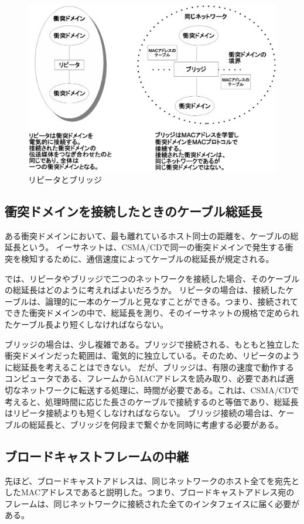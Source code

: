 \begin{figure}[htbp]
	\includegraphics[width=12cm,clip]{draw/repeaterbridge.eps}
	\caption{リピータとブリッジ}
	\label{fig:repeaterbridge}
\end{figure}

\subsection{衝突ドメインを接続したときのケーブル総延長}

ある衝突ドメインにおいて、最も離れているホスト同士の距離を、ケーブルの総延長という。
イーサネットは、CSMA/CDで同一の衝突ドメインで発生する衝突を検知するために、通信速度によってケーブルの総延長が規定される。

では、リピータやブリッジで二つのネットワークを接続した場合、そのケーブルの総延長はどのように考えればよいだろうか。
リピータの場合は、接続したケーブルは、論理的に一本のケーブルと見なすことができる。つまり、接続されてできた衝突ドメインの中で、総延長を測り、そのイーサネットの規格で定められたケーブル長より短くしなければならない。

ブリッジの場合は、少し複雑である。ブリッジで接続される、もともと独立した衝突ドメインだった範囲は、電気的に独立している。そのため、リピータのように総延長を考えることはできない。
だが、ブリッジは、有限の速度で動作するコンピュータである、フレームからMACアドレスを読み取り、必要であれば適切なネットワークに転送する処理に、時間が必要である。これは、CSMA/CDで考えると、処理時間に応じた長さのケーブルで接続するのと等価であり、総延長はリピータ接続よりも短くしなければならない。
ブリッジ接続の場合は、ケーブルの総延長と、ブリッジを何段まで繋ぐかを同時に考慮する必要がある。

\subsection{ブロードキャストフレームの中継}
先ほど、ブロードキャストアドレスは、同じネットワークのホスト全てを宛先としたMACアドレスであると説明した。つまり、ブロードキャストアドレス宛のフレームは、同じネットワークに接続された全てのインタフェイスに届く必要がある。

